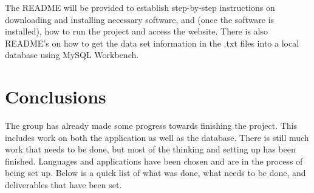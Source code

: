 \documentclass{Group6_Phase2}
\begin{document}
The README will be provided to establish step-by-step instructions on downloading and installing necessary software, and (once the software is installed), how to run the project and access the website. There is also README's on how to get the data set information in the .txt files into a local database using MySQL Workbench. 


\section{Conclusions}
The group has already made some progress towards finishing the project. This includes work on both the application as well as the database. There is still much work that needs to be done, but most of the thinking and setting up has been finished. Languages and applications have been chosen and are in the process of being set up. Below is a quick list of what was done, what needs to be done, and deliverables that have been set.  
\end{document}
